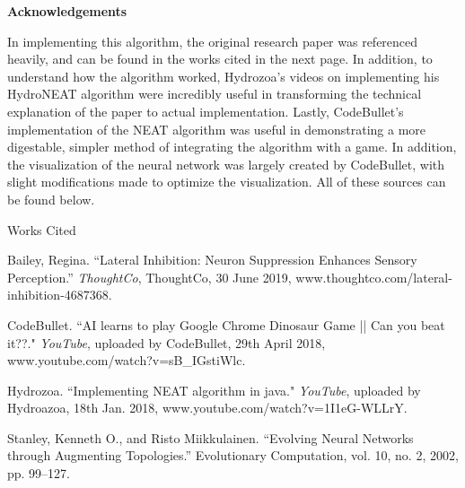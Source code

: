 \documentclass[12pt]{article}
\newcommand{\bibent}{\noindent \hangindent 40pt}
\newenvironment{workscited}{\newpage \begin{center} Works Cited \end{center}}{\newpage }
\begin{document}
\begin{flushleft}
\hfill

\noindent\textbf{Acknowledgements}

In implementing this algorithm, the original research paper was referenced heavily, and can be found in the works cited in the next page. In addition, to understand how the algorithm worked, Hydrozoa's videos on implementing his HydroNEAT algorithm were incredibly useful in transforming the technical explanation of the paper to actual implementation. Lastly, CodeBullet's implementation of the NEAT algorithm was useful in demonstrating a more digestable, simpler method of integrating the algorithm with a game. In addition, the visualization of the neural network was largely created by CodeBullet, with slight modifications made to optimize the visualization. All of these sources can be found below.

\begin{workscited}
\thispagestyle{plain}
\bibent
  Bailey, Regina. “Lateral Inhibition: Neuron Suppression Enhances Sensory Perception.” \emph{ThoughtCo}, ThoughtCo, 30 June 2019, www.thoughtco.com/lateral-inhibition-4687368.

\bibent
  CodeBullet. ``AI learns to play Google Chrome Dinosaur Game || Can you beat it??." \emph{YouTube}, uploaded by CodeBullet, 29th April 2018, www.youtube.com/watch?v=sB\_IGstiWlc.

\bibent
  Hydrozoa. ``Implementing NEAT algorithm in java." \emph{YouTube}, uploaded by Hydroazoa, 18th Jan. 2018, www.youtube.com/watch?v=1I1eG-WLLrY.

\bibent
  Stanley, Kenneth O., and Risto Miikkulainen. “Evolving Neural Networks through Augmenting Topologies.” Evolutionary Computation, vol. 10, no. 2, 2002, pp. 99–127.
\end{workscited}
\end{flushleft}
\end{document}
